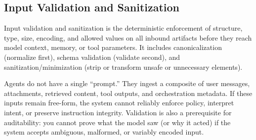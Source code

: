 

\begin{TNtwocol}

    \section{Input Validation and Sanitization}

    Input validation and sanitization is the deterministic enforcement of structure, type, size, encoding, and allowed values on all inbound artifacts before they reach model context, memory, or tool parameters. It includes canonicalization (normalize first), schema validation (validate second), and sanitization/minimization (strip or transform unsafe or unnecessary elements).

    Agents do not have a single “prompt.” They ingest a composite of user messages, attachments, retrieved content, tool outputs, and orchestration metadata. If these inputs remain free-form, the system cannot reliably enforce policy, interpret intent, or preserve instruction integrity. Validation is also a prerequisite for auditability: you cannot prove what the model saw (or why it acted) if the system accepts ambiguous, malformed, or variably encoded input.


\end{TNtwocol}
